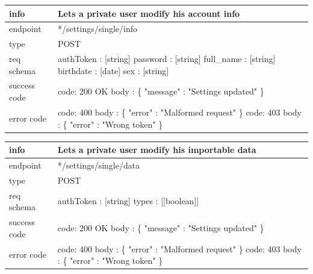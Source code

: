 \documentclass[titlepage]{article}
\begin{document}
\vspace{\baselineskip}

\begin{tabularx}{\textwidth}{lX} \hline
    info & Lets a private user modify his account info \\ \hline
    endpoint & */settings/single/info \\ \hline
    type & POST \\ \hline
    req schema & 
        authToken : [string] \newline
        password : [string] \newline
        full\_name : [string] \newline
        birthdate : [date] \newline
        sex : [string] \\ \hline
    success code &
        code: 200 OK \newline \newline 
        body : \{ \newline
        "message" : "Settings updated" \newline
        \} \\ \hline
    error code &
        code: 400 \newline
        body : \{ "error" : "Malformed request" \} \newline \newline
        code: 403 \newline
        body : \{ "error" : "Wrong token" \} 
\end{tabularx}
		
\vspace{\baselineskip}

\begin{tabularx}{\textwidth}{lX} \hline
    info & Lets a private user modify his importable data \\ \hline
    endpoint & */settings/single/data \\ \hline
    type & POST \\ \hline
    req schema & 
        authToken : [string] \newline
        types : [[boolean]] \\ \hline
    success code &
        code: 200 OK \newline \newline 
        body : \{ \newline
        "message" : "Settings updated" \newline
        \} \\ \hline
    error code &
        code: 400 \newline
        body : \{ "error" : "Malformed request" \} \newline \newline
        code: 403 \newline
        body : \{ "error" : "Wrong token" \} 
\end{tabularx}
		
\end{document}

